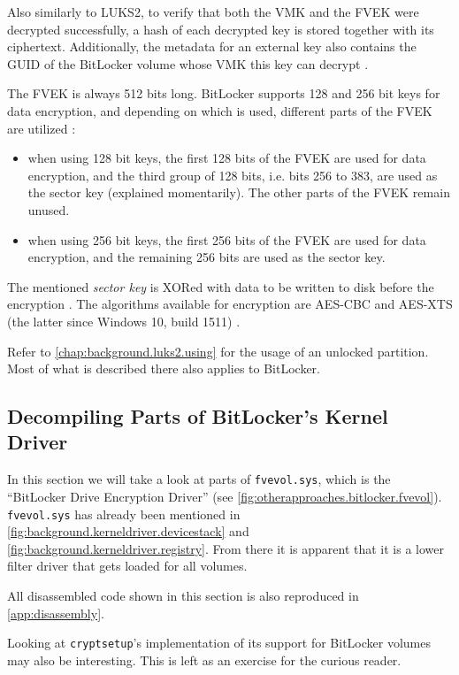Also similarly to LUKS2, to verify that both the VMK and the FVEK were decrypted successfully, a hash of each decrypted key is stored together with its ciphertext. Additionally, the metadata for an external key also contains the GUID of the BitLocker volume whose VMK this key can decrypt \cite{Kornblum2009}.

The FVEK is always 512 bits long. BitLocker supports 128 and 256 bit keys for data encryption, and depending on which is used, different parts of the FVEK are utilized \cite{Kornblum2009}:
\begin{itemize}
	\item when using 128 bit keys, the first 128 bits of the FVEK are used for data encryption, and the third group of 128 bits, i.e. bits 256 to 383, are used as the sector key (explained momentarily). The other parts of the FVEK remain unused.
	\item when using 256 bit keys, the first 256 bits of the FVEK are used for data encryption, and the remaining 256 bits are used as the sector key.
\end{itemize}

The mentioned \emph{sector key} is XORed with data to be written to disk before the encryption \cite{Kornblum2009}. The algorithms available for encryption are AES-CBC and AES-XTS (the latter since Windows 10, build 1511) \cite{Sosnowski2016}.

Refer to \autoref{chap:background.luks2.using} for the usage of an unlocked partition. Most of what is described there also applies to BitLocker.

\subsection{Decompiling Parts of BitLocker's Kernel Driver}
\label{chap:otherapproaches.bitlocker.decompiling}
In this section we will take a look at parts of \texttt{fvevol.sys}, which is the ``BitLocker Drive Encryption Driver'' (see \autoref{fig:otherapproaches.bitlocker.fvevol}). \texttt{fvevol.sys} has already been mentioned in \autoref{fig:background.kerneldriver.devicestack} and \autoref{fig:background.kerneldriver.registry}. From there it is apparent that it is a lower filter driver that gets loaded for all volumes.

All disassembled code shown in this section is also reproduced in \autoref{app:disassembly}.

Looking at \texttt{cryptsetup}'s implementation of its support for BitLocker volumes may also be interesting. This is left as an exercise for the curious reader.

